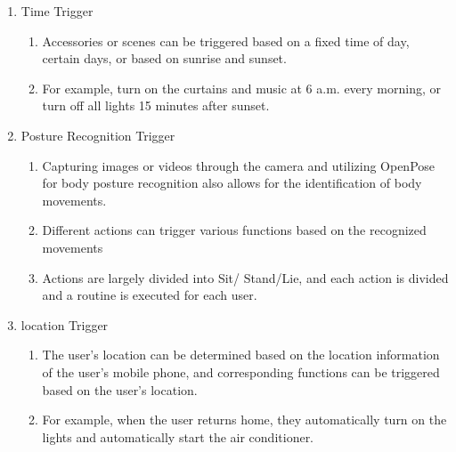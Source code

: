 \begin{enumerate}[label=\arabic*.]
\begin{enumerate}[label*={\arabic*.}]
\begin{enumerate}[label*={\alph*.},ref=\theenumi.\arabic*]
                        \item {\large{Time Trigger}}\\
                              \begin{enumerate}[label*={\arabic*.},ref=\theenumi.\arabic*]
                                  \setlength{\itemindent}{0.5cm}
                                  \item Accessories or scenes can be triggered based on a fixed time of day, certain days, or based on sunrise and sunset. \\
                                  \item For example, turn on the curtains and music at 6 a.m. every morning, or turn off all lights 15 minutes after sunset.\\
                              \end{enumerate}

                        \item {\large{Posture Recognition Trigger}}\\
                              \begin{enumerate}[label*={\arabic*.},ref=\theenumi.\arabic*]
                                  \setlength{\itemindent}{0.5cm}
                                  \item Capturing images or videos through the camera and utilizing OpenPose for body posture recognition also allows for the identification of body movements.\\
                                  \item Different actions can trigger various functions based on the recognized movements
                                  \item Actions are largely divided into Sit/ Stand/Lie, and each action is divided and a routine is executed for each user.\\
                              \end{enumerate}

                        \item {\large{location Trigger}}\\
                              \begin{enumerate}[label*={\arabic*.},ref=\theenumi.\arabic*]
                                  \setlength{\itemindent}{0.5cm}
                                  \item The user's location can be determined based on the location information of the user's mobile phone, and corresponding functions can be triggered based on the user's location.\\
                                  \item For example, when the user returns home, they automatically turn on the lights and automatically start the air conditioner.\\
                                  

\end{enumerate}
\end{enumerate}
\end{enumerate}
\end{enumerate}
